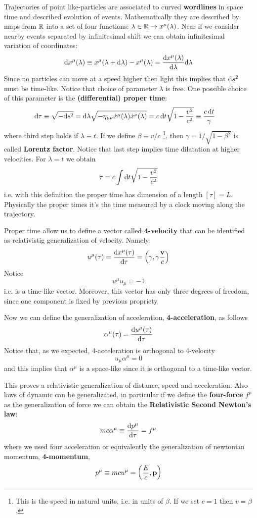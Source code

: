 \documentclass[../main/main.tex]{subfiles}
\begin{document}
Trajectories of point like-particles are associated to curved \textbf{wordlines} in space time and described evolution of events. Mathematically they are described by maps from $\mathbb{R}$ into a set of four functions: $\lambda\in\mathbb{R}\to x^\mu(\lambda)$. Near if we consider nearby events separated by infinitesimal shift we can obtain infinitesimal variation of coordinates:
\[\textup{d} x^\mu(\lambda)\equiv x^\mu(\lambda+\textup{d}\lambda)-x^\mu(\lambda)=\frac{\textup{d} x^\mu(\lambda)}{\textup{d}\lambda}\textup{d}\lambda\]
Since no particles can move at a speed higher then light this implies that $\textup{d} s^2$ must be time-like. Notice that choice of parameter $\lambda$ is free. One possible choice of this parameter is the \textbf{(differential) proper time}:
\begin{align*}
\textup{d}\tau\equiv\sqrt{-\textup{d} s^2}
&=\textup{d}\lambda\sqrt{-\eta_{\mu\nu}\dot x^\mu(\lambda)\dot x^\nu(\lambda)}
=c\,\textup{d} t\sqrt{1-\frac{v^2}{c^2}}\equiv\frac{c\,\textup{d} t}\gamma
\end{align*}
where third step holds if $\lambda\equiv t$. If we define $\beta\equiv v/c$ \footnote{This is the speed in natural units, i.e. in units of $\beta$. If we set $c=1$ then $v=\beta$.}, then $\gamma=1/\sqrt{1-\beta^2}$ is called \textbf{Lorentz factor}. Notice that last step implies time dilatation at higher velocities. For $\lambda=t$ we obtain
\[\tau=c\int\textup{d} t\sqrt{1-\frac{v^2}{c^2}}\]
i.e. with this definition the proper time has dimension of a length $[\tau]=L$. Physically the proper times it's the time measured by a clock moving along the trajectory. 

Proper time allow us to define a vector called \textbf{4-velocity} that can be identified as relativistig generalization of velocity. Namely:
\[u^\mu(\tau)=\frac{\textup{d} x^\mu(\tau)}{\textup{d}\tau}=\left(\gamma,\gamma\frac{\mathbf v}{c}\right)\]
Notice 
\[u^\mu u_\mu=-1\]
i.e. is a time-like vector. Moreover, this vector has only three degrees of freedom, since one component is fixed by previous propriety.


Now we can define the generalization of acceleration, \textbf{4-acceleration}, as follows
\[\alpha^\mu(\tau)=\frac{\textup{d} u^\mu(\tau)}{\textup{d} \tau}\]
Notice that, as we expected, 4-acceleration is orthogonal to 4-velocity
\[u_\mu\alpha^\mu=0\]
and this implies that $\alpha^\mu$ is a space-like since it is orthogonal to a time-like vector.

This proves a relativistic generalization of distance, speed and acceleration. Also laws of dynamic can be generalizated, in particular if we define the \textbf{four-force} $f^\mu$ as the generalization of force we can obtain the
 \textbf{Relativistic Second Newton's law}:
\[mc\alpha^\mu\equiv\frac{\textup{d} p^\mu}{\textup{d}\tau}=f^\mu\]
where we used four acceleration or equivalently the generalization of newtonian momentum, \textbf{4-momentum},
\[p^\mu\equiv mcu^\mu=\left(\frac Ec,\mathbf p\right)\]
\end{document}
